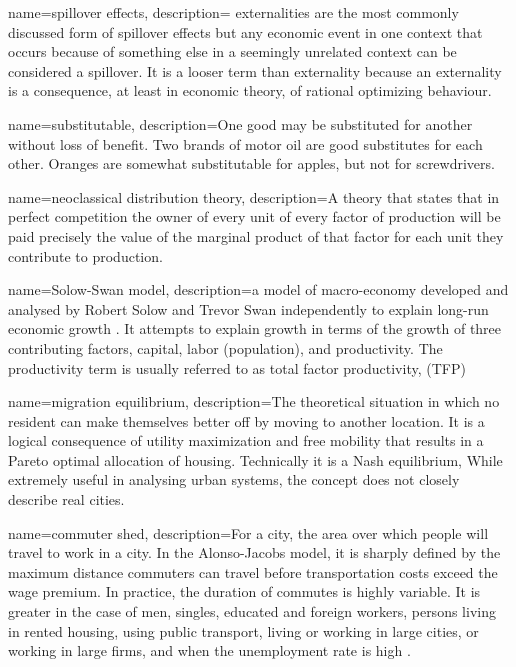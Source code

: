 {
name=spillover effects,
description={ \Gls{externalities} are the most commonly discussed form of spillover effects but any economic event in one context that occurs because of something else in a seemingly unrelated context can be considered a spillover. It is a looser term than externality because an externality is a consequence, at least in economic theory, of rational optimizing behaviour.}
}

{
name=substitutable,
description={One good may be substituted for another without loss of benefit. Two brands of motor oil are good substitutes for each other. Oranges are somewhat substitutable for apples, but not for screwdrivers.}
}

{
name=neoclassical distribution theory,
description={A theory that states that in perfect competition the owner of every unit of every  \gls{factor of production} will be paid precisely the  value of the \gls{marginal product} of that factor for each unit they contribute to production.}
}

{
name=Solow-Swan model,
description={a  model of macro-economy developed and analysed by Robert Solow and Trevor Swan independently to explain long-run economic growth \cite{dimandTrevorSwanNeoclassical2009}. It attempts to explain  growth in terms of the growth of three contributing factors, capital, labor (population), and  productivity. The productivity term is usually referred to as \gls{total factor productivity}, (TFP)}
}

{
name=migration equilibrium,
description={The theoretical situation in which no resident can  make themselves better off by moving to another location. It is a logical consequence of utility maximization and free mobility that results in a Pareto optimal allocation of housing. Technically it is a Nash equilibrium, While extremely useful in analysing urban systems, the concept does not closely describe real cities.
}
}

{
name=commuter shed,
description={For a city, the area over which people will travel to work in a city. In the \gls{Alonso-Jacobs model}, it is sharply defined by the maximum distance commuters can travel before transportation costs exceed the wage premium. In  practice, the duration of commutes is highly variable. It is greater in the case of men, singles, educated and foreign workers, persons living in rented housing, using public transport, living or working in large cities, or working in large firms,  and when the  unemployment rate is high\cite{axisaFactorsInfluencingCommute2012} .}
}

